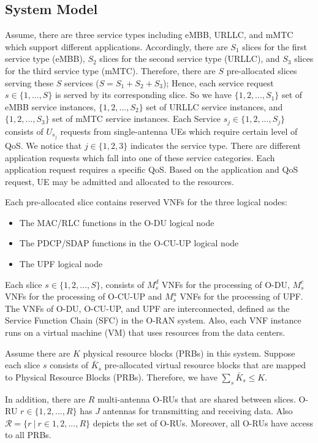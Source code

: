 \documentclass[lettersize,journal]{IEEEtran}
\begin{document}
\subsection{System Model}
Assume, there are three service types including eMBB, URLLC, and mMTC which support different applications. Accordingly, there are $S_1$ slices for the first service type (eMBB), $S_2$ slices for the second service type (URLLC), and $S_3$ slices for the third service type (mMTC).
Therefore, there are $S$ pre-allocated slices serving these $S$ services ($S = S_1 + S_2 + S_3$);
Hence, each service request $s\in \{1,\ldots,S\}$ is served by its corresponding slice. So we have
$\{1,2,...,S_1\}$ set of eMBB service instances, $\{1,2,...,S_2\}$ set of URLLC service instances, and
$\{1,2,...,S_3\}$ set of mMTC service instances.
Each Service $s_j\in \{1,2,...,S_j\} $ consists of $U_{s_j}$ requests from  single-antenna UEs which require certain level of QoS. We notice that $j \in \{1,2,3\}$ indicates the service type.
There are different application requests which fall into one of these service categories. Each application request requires a specific QoS. Based on the application and QoS request, UE may be admitted and allocated to the resources.

Each pre-allocated slice contains reserved VNFs for the three logical nodes:
\begin{itemize}
\item The MAC/RLC functions in the O-DU logical node
\item The PDCP/SDAP functions in the O-CU-UP logical node
\item The UPF logical node
\end{itemize}
Each slice $s \in \{1,2,...,S \}$, consists of  $M_s^{d}$ VNFs for the processing of O-DU, $M_s^{c}$ VNFs for the processing of O-CU-UP and $M_s^{u}$ VNFs for the processing of UPF.
The VNFs of O-DU, O-CU-UP, and UPF are interconnected, defined as the Service Function Chain (SFC) in the O-RAN system. Also, each VNF instance runs on a virtual machine (VM) that uses resources from the data centers.


Assume there are $K$ physical resource blocks (PRBs) in this system. Suppose each slice $s$ consists of $\bar{K}_s$ pre-allocated virtual resource blocks that are mapped to Physical Resource Blocks (PRBs). Therefore, we have $\sum_s \bar{K}_s \leq K$.

In addition, there are $R$ multi-antenna O-RUs that are shared between slices. O-RU $r \in \{1,2,...,R \}$ has $J$ antennas for transmitting and receiving data. Also $\mathcal{R} = \{ r \ | \ r\in 1,2,...,R \}$ depicts the set of O-RUs. Moreover, all O-RUs have access to all PRBs.
\end{document}
